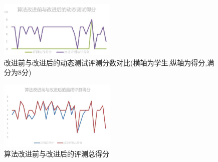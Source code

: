 \begin{figure}[h]
	\centering
	\includegraphics[width=0.5\textwidth]{image/chapter5/1}
  \caption{改进前与改进后的动态测试评测分数对比(横轴为学生,纵轴为得分,满分为8分)}
 	\label{fig:dymamic_graph}
\end{figure}

\begin{figure}[h]
	\centering
	\includegraphics[width=0.5\textwidth]{image/chapter5/2}
	\caption{算法改进前与改进后的评测总得分}
 	\label{fig:grade_graph}
\end{figure}
